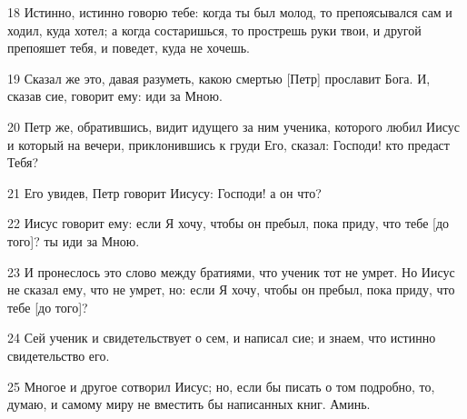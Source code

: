 \par 18 Истинно, истинно говорю тебе: когда ты был молод, то препоясывался сам и ходил, куда хотел; а когда состаришься, то прострешь руки твои, и другой препояшет тебя, и поведет, куда не хочешь.
\par 19 Сказал же это, давая разуметь, какою смертью [Петр] прославит Бога. И, сказав сие, говорит ему: иди за Мною.
\par 20 Петр же, обратившись, видит идущего за ним ученика, которого любил Иисус и который на вечери, приклонившись к груди Его, сказал: Господи! кто предаст Тебя?
\par 21 Его увидев, Петр говорит Иисусу: Господи! а он что?
\par 22 Иисус говорит ему: если Я хочу, чтобы он пребыл, пока приду, что тебе [до того]? ты иди за Мною.
\par 23 И пронеслось это слово между братиями, что ученик тот не умрет. Но Иисус не сказал ему, что не умрет, но: если Я хочу, чтобы он пребыл, пока приду, что тебе [до того]?
\par 24 Сей ученик и свидетельствует о сем, и написал сие; и знаем, что истинно свидетельство его.
\par 25 Многое и другое сотворил Иисус; но, если бы писать о том подробно, то, думаю, и самому миру не вместить бы написанных книг. Аминь.


